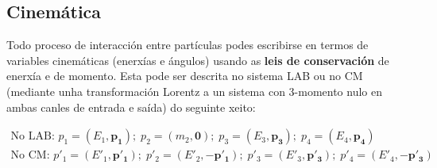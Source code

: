 \documentclass[11pt, a4paper]{article}
\newcommand{\vect}[1]{\boldsymbol{#1}}
\begin{document}


\subsection{Cinemática}
Todo proceso de interacción entre partículas podes escribirse en termos de variables cinemáticas (enerxías e ángulos) usando as \textbf{leis de conservación} de enerxía e de momento. Esta pode ser descrita no sistema LAB ou no CM (mediante unha transformación Lorentz a un sistema con 3-momento nulo en ambas canles de entrada e saída) do seguinte xeito:

\begin{equation*}
    \begin{gathered}
        \text{No LAB:  }p_1=\left(E_1, \vect{p_1}\right); \; p_2=\left(m_2, \vect{0}\right); \; p_3=\left(E_3, \vect{p_3}\right); \; p_4=\left(E_4, \vect{p_4}\right) \\
        \text{No CM:  }p'_1=\left(E'_1, \vect{p'_1}\right); \;  p'_2=\left(E'_2, -\vect{p'_1}\right); \; p'_3=\left(E'_3, \vect{p'_3}\right); \; p'_4=\left(E'_4, -\vect{p'_3}\right)
    \end{gathered}
\end{equation*}
\end{document}
